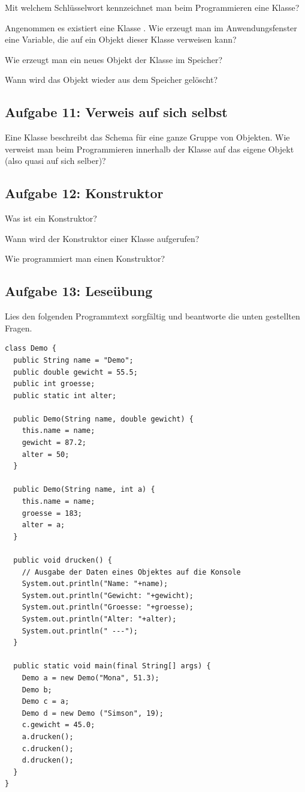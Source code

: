 \begin{compactenum}[a)]
\item Mit welchem Schlüsselwort kennzeichnet man beim Programmieren eine
Klasse?
\item Angenommen es existiert eine Klasse . Wie erzeugt man im
Anwendungsfenster eine Variable, die auf ein Objekt dieser Klasse verweisen
kann?
\item Wie erzeugt man ein neues Objekt der Klasse im Speicher?
\item Wann wird das Objekt wieder aus dem Speicher gelöscht?
\end{compactenum}


\subsection{Aufgabe 11: Verweis auf sich selbst}

Eine Klasse beschreibt das Schema für eine ganze Gruppe von Objekten. Wie
verweist man beim Programmieren innerhalb der Klasse auf das eigene Objekt
(also quasi auf sich selber)? 


\subsection{Aufgabe 12: Konstruktor}

\begin{compactenum}[a)]
\item Was ist ein Konstruktor?
\item Wann wird der Konstruktor einer Klasse aufgerufen?
\item Wie programmiert man einen Konstruktor?
\end{compactenum}


\subsection{Aufgabe 13: Leseübung}

Lies den folgenden Programmtext sorgfältig und beantworte die unten gestellten
Fragen.

\begin{lstlisting}
class Demo {
  public String name = "Demo";
  public double gewicht = 55.5;
  public int groesse;
  public static int alter;

  public Demo(String name, double gewicht) {
    this.name = name;
    gewicht = 87.2;
    alter = 50;
  }

  public Demo(String name, int a) {
    this.name = name;
    groesse = 183;
    alter = a;
  }

  public void drucken() {
    // Ausgabe der Daten eines Objektes auf die Konsole
    System.out.println("Name: "+name);
    System.out.println("Gewicht: "+gewicht);
    System.out.println("Groesse: "+groesse);
    System.out.println("Alter: "+alter);
    System.out.println(" ---");
  }

  public static void main(final String[] args) {
    Demo a = new Demo("Mona", 51.3);
    Demo b;
    Demo c = a;
    Demo d = new Demo ("Simson", 19);
    c.gewicht = 45.0;
    a.drucken();
    c.drucken();
    d.drucken();
  }
}
\end{lstlisting}

